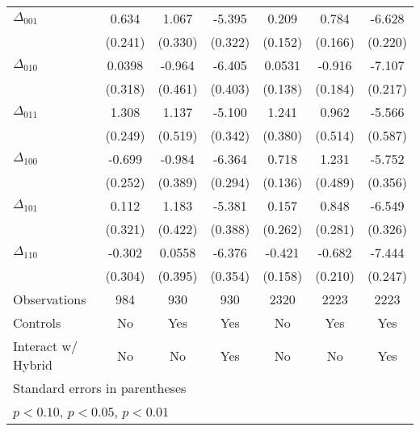 {\begin{tabular}{l*{6}{c}}
$\Delta_{001}$	&    0.634\sym{***}	&    1.067\sym{***}	&   -5.395\sym{***}	&    0.209          &    0.784\sym{***}	&	-6.628\sym{***}	\\ &  (0.241)	&  (0.330)	&  (0.322) 	&  (0.152)	&  (0.166)	&  (0.220)	 \\
$\Delta_{010}$	&   0.0398         	&   -0.964\sym{**} 	&   -6.405\sym{***}	&   0.0531          &   -0.916\sym{***}	&	-7.107\sym{***}	\\ &  (0.318)	&  (0.461)	&  (0.403) 	&  (0.138)	&  (0.184)	&  (0.217)	 \\
$\Delta_{011}$	&    1.308\sym{***}	&    1.137\sym{**} 	&   -5.100\sym{***}	&    1.241\sym{***} &    0.962\sym{*}  	&	-5.566\sym{***}	\\ &  (0.249)	&  (0.519)	&  (0.342) 	&  (0.380)	&  (0.514)	&  (0.587)	 \\
$\Delta_{100}$	&   -0.699\sym{***}	&   -0.984\sym{**} 	&   -6.364\sym{***}	&    0.718\sym{***} &    1.231\sym{**} 	&	-5.752\sym{***}	\\ &  (0.252)	&  (0.389)	&  (0.294) 	&  (0.136)	&  (0.489)	&  (0.356)	 \\
$\Delta_{101}$	&    0.112         	&    1.183\sym{***}	&   -5.381\sym{***}	&    0.157          &    0.848\sym{***}	&	-6.549\sym{***}	\\ &  (0.321)	&  (0.422)	&  (0.388) 	&  (0.262)	&  (0.281)	&  (0.326)	 \\
$\Delta_{110}$	&   -0.302         	&   0.0558         	&   -6.376\sym{***}	&   -0.421\sym{***} &   -0.682\sym{***}	&	-7.444\sym{***}	\\ &  (0.304)	&  (0.395)	&  (0.354) 	&  (0.158)	&  (0.210)	&  (0.247)	 \\

\hline
Observations&      984         &      930         &      930 &     2320         &     2223         &     2223 \\
Controls  &       No         &      Yes         &      Yes &       No         &      Yes         &      Yes         \\
Interact w/ Hybrid &       No         &       No         &      Yes &       No         &       No         &      Yes         \\


\hline\hline
\multicolumn{4}{l}{\footnotesize Standard errors in parentheses}\\
\multicolumn{4}{l}{\footnotesize \sym{*} \(p<0.10\), \sym{**} \(p<0.05\), \sym{***} \(p<0.01\)}\\
\end{tabular}
}
